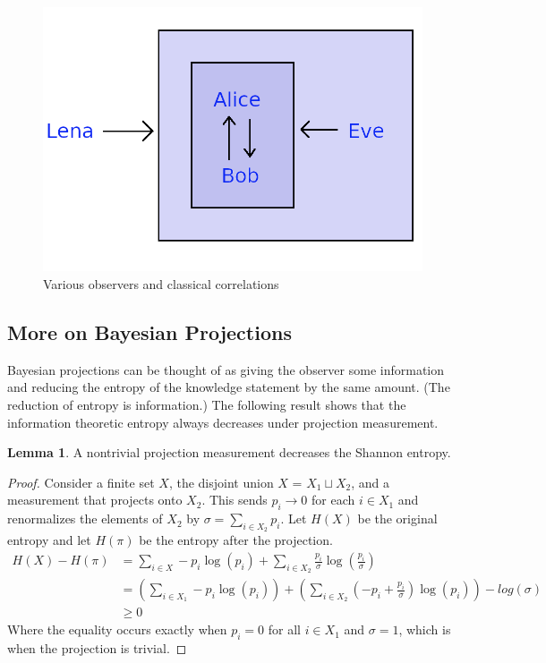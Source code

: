 \documentclass[12pt,a4paper]{article}
\theoremstyle{myrule}
\theoremstyle{postulate}
\theoremstyle{definition}
\newtheorem{lemma}[theorem]{Lemma}
\begin{document}
\begin{figure}[h]
\centering
\includegraphics[scale=1.0]{alice_and_bob.png}
\caption{Various observers and classical correlations}
\label{anb}
\end{figure}

\subsection{More on Bayesian Projections}
\label{entropy}
Bayesian projections can be thought of as giving the observer some information and reducing the entropy of the knowledge statement by the same amount.  (The reduction of entropy is information.) The following result shows that the information theoretic entropy always decreases under projection measurement.

\begin{lemma}
A nontrivial projection measurement decreases the Shannon entropy.
\end{lemma}
\begin{proof}
Consider a finite set $X$, the disjoint union $X$ = $X_1 \sqcup X_2$, and a measurement that projects onto $X_2$.  This sends $p_i \rightarrow 0$ for each $i \in X_1$ and renormalizes the elements of $X_2$ by $\sigma = \sum_{i \in X_2} p_i$.  Let $H(X)$ be the original entropy and let $H(\pi)$ be the entropy after the projection.
\[
\begin{split}
H(X) - H(\pi) &= \sum_{i \in X} - p_i \log(p_i) + \sum_{i \in X_2} \frac{p_i}{\sigma} \log\left(\frac{p_i}{\sigma}\right) \\
              &= \left(\sum_{i \in X_1} - p_i \log(p_i)\right) + \left(\sum_{i \in X_2} \left(-p_i + \frac{p_i}{\sigma}\right) \log(p_i) \right) - log(\sigma) \\
              &\ge 0
\end{split}
\]
Where the equality occurs exactly when $p_i = 0$ for all $i \in X_1$ and $\sigma = 1$, which is when the projection is trivial. 
\end{proof}
\end{document}
